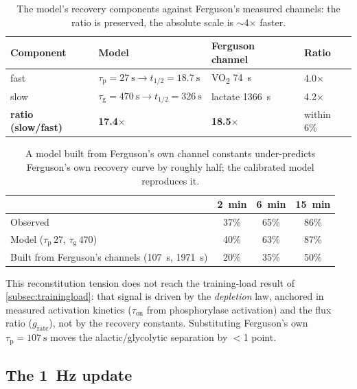 \documentclass[11pt,a4paper]{article}
\newcommand{\grate}{\ensuremath{g_{\mathrm{rate}}}}
\newcommand{\taup}{\ensuremath{\tau_{\mathrm p}}}
\newcommand{\taug}{\ensuremath{\tau_{\mathrm g}}}
\newcommand{\tauon}{\ensuremath{\tau_{\mathrm{on}}}}
\newcommand{\halft}{\ensuremath{t_{1/2}}}
\begin{document}
\begin{table}[htbp]\centering\small
\caption{The model's recovery components against Ferguson's measured channels: the ratio is preserved, the
absolute scale is $\sim$4$\times$ faster.}
\label{tab:components}
\renewcommand{\arraystretch}{1.2}
\begin{tabular}{@{}llll@{}}
\toprule
\textbf{Component} & \textbf{Model} & \textbf{Ferguson channel} & \textbf{Ratio} \\
\midrule
fast & $\taup = 27~\mathrm{s} \rightarrow \halft = 18.7~\mathrm{s}$ & VO\textsubscript{2} 74~s & 4.0$\times$ \\
slow & $\taug = 470~\mathrm{s} \rightarrow \halft = 326~\mathrm{s}$ & lactate 1366~s & 4.2$\times$ \\
\textbf{ratio (slow/fast)} & \textbf{17.4$\times$} & \textbf{18.5$\times$} & within 6\% \\
\bottomrule
\end{tabular}
\end{table}

\begin{table}[htbp]\centering\small
\caption{A model built from Ferguson's own channel constants under-predicts Ferguson's own recovery curve
by roughly half; the calibrated model reproduces it.}
\label{tab:fergusonbuild}
\renewcommand{\arraystretch}{1.2}
\begin{tabular}{@{}lccc@{}}
\toprule
 & \textbf{2~min} & \textbf{6~min} & \textbf{15~min} \\
\midrule
Observed\citep{Ferguson2010} & 37\% & 65\% & 86\% \\
Model ($\taup\,27$, $\taug\,470$) & 40\% & 63\% & 87\% \\
Built from Ferguson's channels (107~s, 1971~s) & 20\% & 35\% & 50\% \\
\bottomrule
\end{tabular}
\end{table}

This reconstitution tension does not reach the training-load result of \cref{subsec:trainingload}: that
signal is driven by the \emph{depletion} law, anchored in measured activation kinetics (\tauon{} from
phosphorylase activation\citep{Parolin1999}) and the flux ratio (\grate\citep{diPrampero1999}), not by the
recovery constants. Substituting Ferguson's own $\taup = \SI{107}{\second}$ moves the alactic/glycolytic
separation by $<$1 point.

\subsection{The 1~Hz update}\label{subsec:update}
\end{document}

